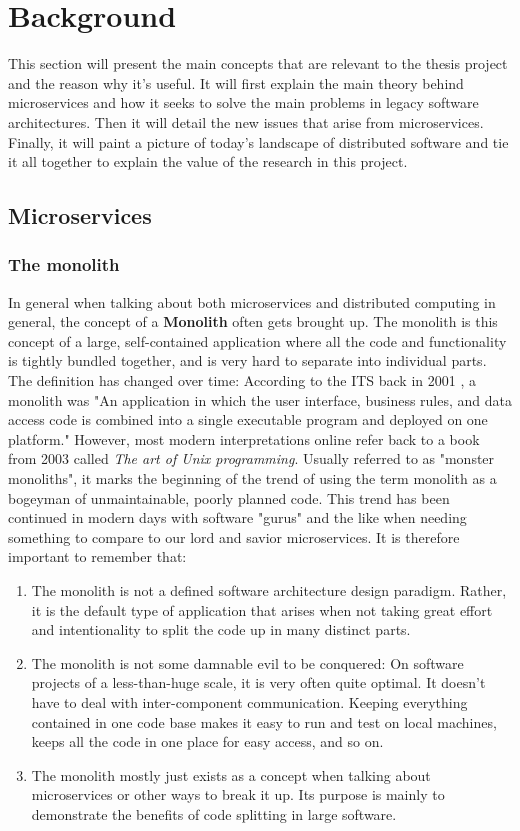 \chapter{Background}

\label{Chapter2}

This section will present the main concepts that are relevant to the thesis project and the reason why it's useful.
It will first explain the main theory behind microservices and how it seeks to solve the main problems in legacy software architectures. Then it will
detail the new issues that arise from microservices. Finally, it will paint a picture of today's landscape of distributed software and 
tie it all together to explain the value of the research in this project.

\section{Microservices}
\subsection{The monolith}
In general when talking about both microservices and distributed computing in general, the concept of a \textbf{Monolith} often gets brought up. 
The monolith is this concept of a large, self-contained application where all the code and functionality is tightly bundled together, and is very hard to separate into individual parts.
The definition has changed over time: According to the ITS back in 2001 \cite{ITS}, a monolith was "An application in which the user interface, business rules, and data access code is combined into a single executable program and deployed on one platform."
However, most modern interpretations online refer back to a book from 2003 called \textit{The art of Unix programming}. Usually referred to as "monster monoliths", it marks the beginning of the trend of using the term monolith as a bogeyman of unmaintainable, poorly planned code. 
This trend has been continued in modern days with software "gurus" and the like when needing something to compare to our lord and savior microservices\cite*{Gouigoux2017}.
It is therefore important to remember that:
\begin{enumerate}
    \item The monolith is not a defined software architecture design paradigm. Rather, it is the default type of application that arises when not taking great effort and intentionality to split the code up in many distinct parts.
    \item The monolith is not some damnable evil to be conquered: On software projects of a less-than-huge scale, it is very often quite optimal. It doesn't have to deal with inter-component communication. Keeping everything contained in one code base makes it easy to run and test on local machines, keeps all the code in one place for easy access, and so on. 
    \item The monolith mostly just exists as a concept when talking about microservices or other ways to break it up. Its purpose is mainly to demonstrate the benefits of code splitting in large software.
\end{enumerate}

